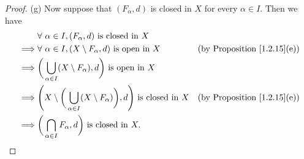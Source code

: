 \begin{proof}{(g)}
    Now suppose that \((F_\alpha, d)\) is closed in \(X\) for every \(\alpha \in I\).
    Then we have
    \begin{align*}
                 & \forall\ \alpha \in I, (F_\alpha, d) \text{ is closed in } X                                                                                           \\
        \implies & \forall\ \alpha \in I, (X \setminus F_\alpha, d) \text{ is open in } X                                       & \text{(by Proposition \ref{1.2.15}(e))} \\
        \implies & \bigg(\bigcup_{\alpha \in I} (X \setminus F_\alpha), d\bigg) \text{ is open in } X                                                                     \\
        \implies & \Bigg(X \setminus \bigg(\bigcup_{\alpha \in I} (X \setminus F_\alpha)\bigg), d\Bigg) \text{ is closed in } X & \text{(by Proposition \ref{1.2.15}(e))} \\
        \implies & \bigg(\bigcap_{\alpha \in I} F_\alpha, d\bigg) \text{ is closed in } X.
    \end{align*}
\end{proof}

